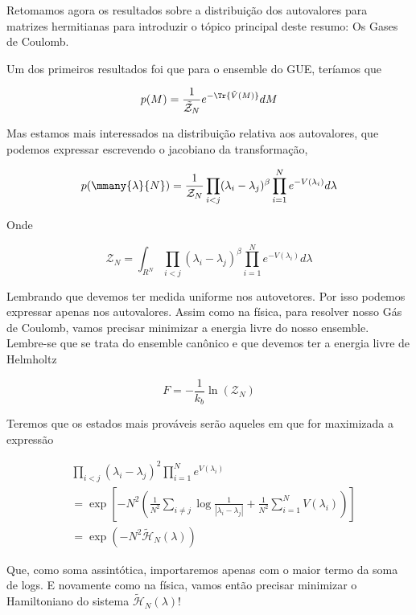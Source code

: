 Retomamos agora os resultados sobre a distribuição dos autovalores para matrizes hermitianas para introduzir o tópico principal deste resumo: Os Gases de Coulomb.

Um dos primeiros resultados foi que para o ensemble do GUE, teríamos que

\[
	p(M) = \frac{1}{\mathcal{\tilde{Z}}_N} e^{-\Tr{\tilde{V}(M)}} dM
\]

Mas estamos mais interessados na distribuição relativa aos autovalores, que podemos expressar escrevendo o jacobiano da transformação,

\[
	p(\mmany{\lambda}{N}) =  \frac{1}{\mathcal{Z}_N} \prod_{i<j} (\lambda_i - \lambda_j)^\beta \prod_{i=1}^{N} e^{-V(\lambda_i)} d\lambda
\]

Onde 

\[
	\mathcal{Z}_N = \int_{R^N} \prod_{i<j} (\lambda_i - \lambda_j)^\beta \prod_{i=1}^{N} e^{-V(\lambda_i)} d\lambda
\]

Lembrando que devemos ter medida uniforme nos autovetores. Por isso podemos expressar apenas nos autovalores. Assim como na física, para resolver nosso Gás de Coulomb, vamos precisar minimizar a energia livre do nosso ensemble. Lembre-se que se trata do ensemble canônico e que devemos ter a energia livre de Helmholtz

\[
	F = -\frac{1}{k_b} \ln{(\mathcal{Z}_N)}
\]

Teremos que os estados mais prováveis serão aqueles em que for maximizada a expressão

\begin{align*}
	&\prod_{i<j} (\lambda_i - \lambda_j)^2 \prod_{i=1}^{N} e^{V(\lambda_i)} \\
	& = \exp{\left[-N^2 \left( \frac{1}{N^2}\sum_{i\neq j}\log{\frac{1}{|\lambda_i - \lambda_j|}} + \frac{1}{N^2} \sum_{i=1}^{N} V(\lambda_i)  \right)\right]} \\
	& = \exp{(-N^2 \mathcal{\tilde{H}}_N(\lambda) )}
\end{align*}

Que, como soma assintótica, importaremos apenas com o maior termo da soma de logs. E novamente como na física, vamos então precisar minimizar o Hamiltoniano do sistema $\mathcal{\tilde{H}}_N(\lambda)$!